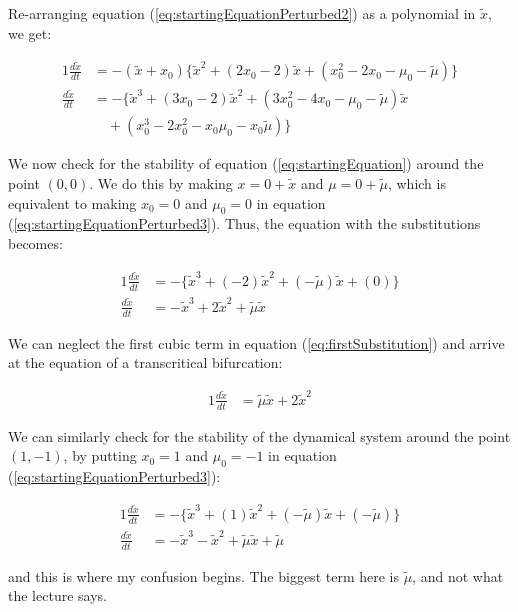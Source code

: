 \documentclass{article}
\begin{document}
Re-arranging equation (\ref{eq:startingEquationPerturbed2}) as a polynomial in $\tilde{x}$, we get:

	\begin{alignat}{1}
		\label{eq:startingEquationPerturbed3}
		\frac{d\tilde{x}}{dt} &= -(\tilde{x}+x_0)\{\tilde{x}^2 + (2x_0-2)\tilde{x} + (x_0^2-2x_0-\mu_0-\tilde{\mu})\} \nonumber \\		
		\frac{d\tilde{x}}{dt} &= -\{\tilde{x}^3 + (3x_0-2)\tilde{x}^2 + (3x_0^2-4x_0-\mu_0-\tilde{\mu})\tilde{x} \\&{\hspace{12pt}}   +(x_0^3 -2x_0^2 -x_0\mu_0 -x_0\tilde{\mu})\} \nonumber
	\end{alignat}	
	
	We now check for the stability of equation (\ref{eq:startingEquation}) around the point $(0,0)$. We do this by making $x = 0 + \tilde{x}$ and $\mu = 0 + \tilde{\mu}$, which is equivalent to making $x_0 = 0$ and $\mu_0 = 0$ in equation (\ref{eq:startingEquationPerturbed3}). Thus, the equation with the substitutions becomes:
	
	\begin{alignat}{1}
		\label{eq:firstSubstitution}
		\frac{d\tilde x}{dt} &= -\{\tilde{x}^3 + (-2)\tilde{x}^2 + (-\tilde{\mu})\tilde{x} +(0)\} \nonumber \\
		 \frac{d\tilde x}{dt} &= -\tilde{x}^3 + 2\tilde{x}^2 + \tilde{\mu}\tilde{x}
	\end{alignat}
	
	We can neglect the first cubic term in equation (\ref{eq:firstSubstitution}) and arrive at the equation of a transcritical bifurcation:
	
	\begin{alignat}{1}
		\frac{d\tilde{x}}{dt} &= \tilde{\mu}\tilde{x} + 2\tilde{x}^2
	\end{alignat}
	
	We can similarly check for the stability of the dynamical system around the point $(1,-1)$, by putting $x_0 = 1$ and $\mu_0 = -1$ in equation (\ref{eq:startingEquationPerturbed3}):
	
	\begin{alignat}{1}
		\frac{d\tilde{x}}{dt} &= -\{\tilde{x}^3 + (1)\tilde{x}^2 + (-\tilde{\mu})\tilde{x} + (-\tilde{\mu})\} \nonumber \\
		\frac{d\tilde{x}}{dt} &=  -\tilde{x}^3 - \tilde{x}^2 + \tilde{\mu}\tilde{x} + \tilde{\mu}
	\end{alignat}

	and this is where my confusion begins. The biggest term here is $\tilde{\mu}$, and not what the lecture says.
\end{document}
